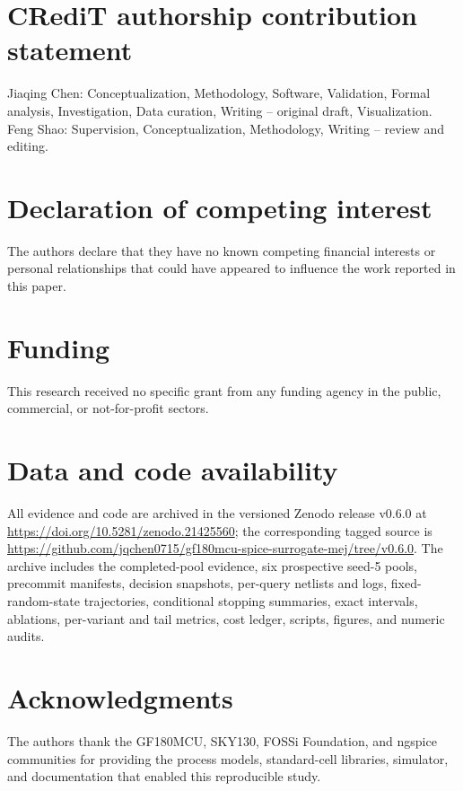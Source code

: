 \documentclass[preprint,12pt]{elsarticle}
\begin{document}
\section*{CRediT authorship contribution statement}

Jiaqing Chen: Conceptualization, Methodology, Software, Validation, Formal analysis, Investigation, Data curation, Writing -- original draft, Visualization. Feng Shao: Supervision, Conceptualization, Methodology, Writing -- review and editing.

\section*{Declaration of competing interest}

The authors declare that they have no known competing financial interests or personal relationships that could have appeared to influence the work reported in this paper.

\section*{Funding}

This research received no specific grant from any funding agency in the public, commercial, or not-for-profit sectors.

\section*{Data and code availability}

All evidence and code are archived in the versioned Zenodo release v0.6.0 at \url{https://doi.org/10.5281/zenodo.21425560}; the corresponding tagged source is \url{https://github.com/jqchen0715/gf180mcu-spice-surrogate-mej/tree/v0.6.0}. The archive includes the completed-pool evidence, six prospective seed-5 pools, precommit manifests, decision snapshots, per-query netlists and logs, fixed-random-state trajectories, conditional stopping summaries, exact intervals, ablations, per-variant and tail metrics, cost ledger, scripts, figures, and numeric audits.

\section*{Acknowledgments}

The authors thank the GF180MCU, SKY130, FOSSi Foundation, and ngspice communities for providing the process models, standard-cell libraries, simulator, and documentation that enabled this reproducible study.
\end{document}
